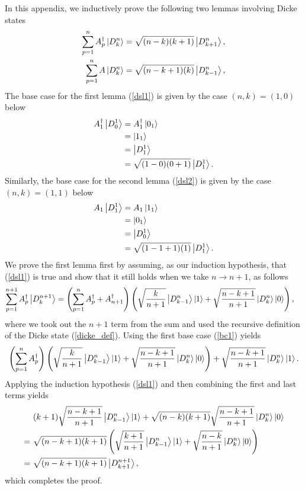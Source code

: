 \documentclass[Dual]{msu-thesis}
\begin{document}
\begin{appendices}
In this appendix, we inductively prove the following two lemmas involving Dicke states
\begin{align}
\label{dsl1}
\sum_{p=1}^{n}A^\dagger_p\ket{D^n_k}
&=\sqrt{(n-k)(k+1)}\ket{D^n_{k+1}},
\\
\label{dsl2}
\sum_{p=1}^nA\ket{D^n_k}
&=\sqrt{(n-k+1)(k)}\ket{D^n_{k-1}},
\end{align}
The base case for the first lemma (\ref{dsl1}) is given by the case $(n,k)=(1,0)$ below
\begin{align}
\label{bc1}
A^\dagger_1\ket{D^1_0}
&=
A^\dagger_1\ket{0_1}
\nonumber
\\
&=
\ket{1_1}
\nonumber
\\
&=\ket{D^1_1}
\nonumber
\\
&=\sqrt{(1-0)(0+1)}\ket{D^1_1}.
\end{align}
Similarly, the base case for the second lemma (\ref{dsl2}) is given by the case $(n,k)=(1,1)$ below
\begin{align}
\label{bc2}
A_1\ket{D^1_1}
&=
A_1\ket{1_1}
\nonumber
\\
&=
\ket{0_1}
\nonumber
\\
&=\ket{D^1_0}
\nonumber
\\
&=\sqrt{(1-1+1)(1)}\ket{D^1_1}.
\end{align}
We prove the first lemma first by assuming, as our induction hypothesis, that (\ref{dsl1}) is true and show that it still holds when we take $n\to n+1$, as follows
\begin{align}
\sum_{p=1}^{n+1}A^\dagger_p\ket{D^{n+1}_k}
&=
\left(\sum_{p=1}^{n}A^\dagger_p + A^\dagger_{n+1}\right)\left(\sqrt{\frac{k}{n+1}}\ket{D^{n}_{k-1}}\ket{1}+\sqrt{\frac{n-k+1}{n+1}}\ket{D^{n}_k}\ket{0}\right),
\end{align}
where we took out the $n+1$ term from the sum and used the recursive definition of the Dicke state (\ref{dicke_def}).
Using the first base case (\ref{bc1}) yields
\begin{align}
\left(\sum_{p=1}^{n}A^\dagger_p\right)\left(\sqrt{\frac{k}{n+1}}\ket{D^{n}_{k-1}}\ket{1}+\sqrt{\frac{n-k+1}{n+1}}\ket{D^{n}_k}\ket{0}\right)
+
\sqrt{\frac{n-k+1}{n+1}}\ket{D^{n}_k}\ket{1}.
\end{align}
Applying the induction hypothesis (\ref{dsl1}) and then combining the first and last terms yields 
\begin{align}
&
(k+1)\sqrt{\frac{n-k+1}{n+1}}\ket{D^{n}_{k-1}}\ket{1}+\sqrt{(n-k)(k+1)}\sqrt{\frac{n-k+1}{n+1}}\ket{D^{n}_k}\ket{0}
\\
= \ &
\sqrt{(n-k+1)(k+1)}
\left(
\sqrt{\frac{k+1}{n+1}}\ket{D^{n}_{k-1}}\ket{1}+\sqrt{\frac{n-k}{n+1}}\ket{D^{n}_k}\ket{0}
\right)
\\
= \ &
\sqrt{(n-k+1)(k+1)}\ket{D^{n+1}_{k+1}},
\end{align}
which completes the proof. 


\end{appendices}
\end{document}
